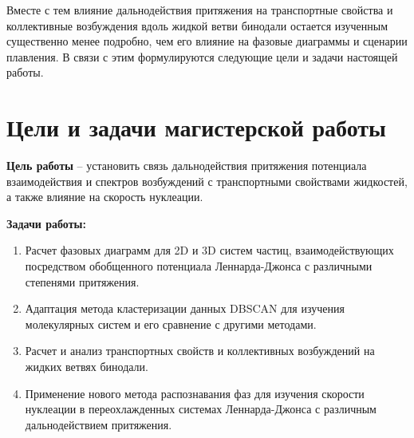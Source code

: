 Вместе с тем влияние дальнодействия притяжения на транспортные свойства и коллективные возбуждения вдоль жидкой ветви бинодали остается изученным существенно менее подробно, чем его влияние на фазовые диаграммы и сценарии плавления.
В связи с этим формулируются следующие цели и задачи настоящей работы.

\section{Цели и задачи магистерской работы}

\textbf{Цель работы} -- установить связь дальнодействия притяжения потенциала взаимодействия и спектров возбуждений с транспортными свойствами жидкостей, а также влияние на скорость нуклеации.

\textbf{Задачи работы:}
\begin{enumerate}
  \item Расчет фазовых диаграмм для 2D и 3D систем частиц, взаимодействующих посредством обобщенного потенциала Леннарда-Джонса с различными степенями притяжения.
  \item Адаптация метода кластеризации данных DBSCAN для изучения молекулярных систем и его сравнение с другими методами.
  \item Расчет и анализ транспортных свойств и коллективных возбуждений на жидких ветвях бинодали.
  \item Применение нового метода распознавания фаз для изучения скорости нуклеации в переохлажденных системах Леннарда-Джонса с различным дальнодействием притяжения.
\end{enumerate}
